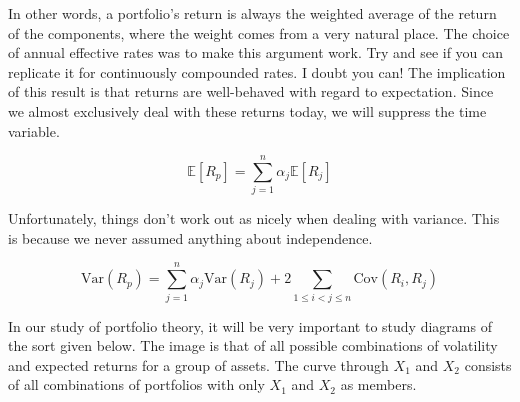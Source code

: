 \documentclass{ximera}
\begin{document}
In other words, a portfolio's return is always the weighted average of the return of the components, where the weight comes from a very natural place. The choice of annual effective rates was to make this argument work. Try and see if you can replicate it for continuously compounded rates. I doubt you can! The implication of this result is that returns are well-behaved with regard to expectation. Since we almost exclusively deal with these returns today, we will suppress the time variable.

\begin{equation*}
\mathbb{E}[R_p]=\sum_{j=1}^n\alpha_j\mathbb{E}[R_j]
\end{equation*}

Unfortunately, things don't work out as nicely when dealing with variance. This is because we never assumed anything about independence. 

\begin{equation*}
\text{Var}(R_p)=\sum_{j=1}^n\alpha_j\text{Var}(R_j)+2\sum_{1\leq i< j\leq n}\text{Cov}(R_i, R_j)
\end{equation*}

In our study of portfolio theory, it will be very important to study diagrams of the sort given below. The image is that of all possible combinations of volatility and expected returns for a group of assets. The curve through $X_1$ and $X_2$ consists of all combinations of portfolios with only $X_1$ and $X_2$ as members. 
\end{document}
